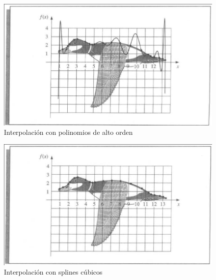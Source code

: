     \begin{figure}
      \centering
      \includegraphics[width=0.8\linewidth]{tema2/pato-interpol}
      \caption{Interpolación con polinomios de alto orden}
      \label{fig:pato-alto-orden}
    \end{figure}

    \begin{figure}
      \centering
      \includegraphics[width=0.8\linewidth]{tema2/pato-spline}
      \caption{Interpolación con splines cúbicos}
      \label{fig:pato-spline}
    \end{figure}

